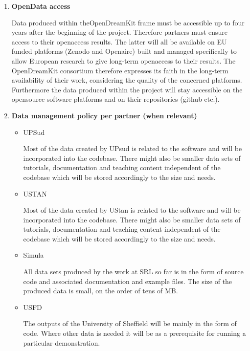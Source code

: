 \documentclass{deliverablereport}
\begin{document}
\begin{enumerate}
\item\textbf{OpenData access}

Data produced within theOpenDreamKit frame must be accessible up to four years after the beginning of the project. Therefore partners must ensure access to their openaccess results.
The latter will all be available on EU funded platforms (Zenodo and Openaire) built and managed specifically to allow European research to give long-term openaccess to their results. The OpenDreamKit consortium therefore expresses its faith in the long-term availability of their work, considering the quality of the concerned platforms. Furthermore the data produced within the project will stay accessible on the opensource software platforms and on their repositories (github etc.).


\item\textbf{Data management policy per partner (when relevant)}
\begin{itemize}



\item{UPSud}

Most of the data created by UPsud is related to the software \Sage and will be incorporated into the \Sage codebase. There might also be smaller data sets of tutorials, documentation and teaching content independent of the \Sage codebase which will be stored accordingly to the size and needs.



\item{USTAN}

Most of the data created by UStan is related to the software \GAP and will be incorporated into the \GAP codebase. There might also be smaller data sets of tutorials, documentation and teaching content independent of the \GAP codebase which will be stored accordingly to the size and needs.



\item{Simula}

All data sets produced by the work at SRL so far is in the form of source code and associated documentation and example files. The size of the produced data is small, on the order of tens of MB.



\item{USFD}



The outputs of the University of Sheffield will be mainly in the form of code. Where other data is needed it will be as a prerequisite for running a particular demonstration. 
\end{itemize}
\end{enumerate}
\end{document}
